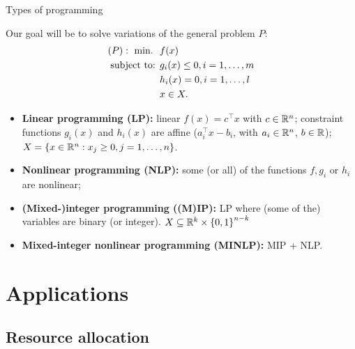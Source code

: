 \begin{frame}{Types of programming}

	Our goal will be to solve variations of the general problem $P$:
	\begin{align*}
		(P) :~ \mathop{\text{min.} \ } \ & f(x) \\
		\mbox{subject to: } & g_i(x) \leq 0, i = 1, \dots, m\\
		& h_i(x) = 0, i = 1, \dots, l \\
		& x \in X.
	\end{align*}
	\pause
	\vspace{-24pt}
	\begin{itemize}
	\item {\bf Linear programming (LP):} \alert{linear} $f(x) = c^\top x$ with $c \in \mathbb R^n$; constraint functions $g_i(x)$ and $h_i(x)$ are \alert{affine} ($a_i^\top x - b_i$, with $a_i \in \mathbb R^n$, $b \in \mathbb R$); $X = \left\{  x \in \mathbb R^n : x_j \geq 0, j =1,\dots,n \right \}$.  
	\pause
	\item {\bf Nonlinear programming (NLP):} some (or all) of the functions $f, g_i$ or $h_i$ are \alert{nonlinear};
	\pause
	\item {\bf (Mixed-)integer programming ((M)IP):} LP where (some of the) variables are \alert{binary (or integer)}. $X \subseteq \mathbb R^k \times \left\{ 0,1 \right \}^{n-k}$ 
	\pause 
	\item {\bf Mixed-integer\hspace{-1pt} nonlinear\hspace{-2pt} programming\hspace{-2pt} (MINLP):}\hspace{-1pt} {\small MIP\hspace{-3pt} +\hspace{-3pt} NLP.} 
	\end{itemize}

\end{frame}


\section{Applications}


\subsection{Resource allocation}


